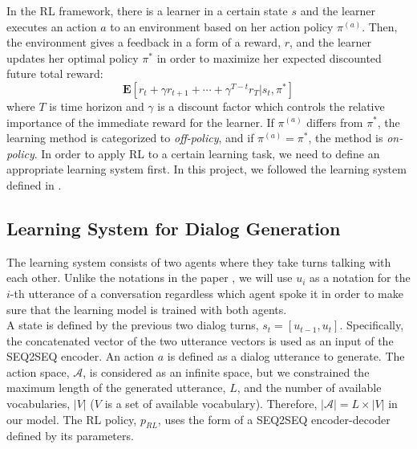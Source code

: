 In the RL framework, there is a learner in a certain state $s$ and the learner executes an action $a$ to an environment based on her action policy $\pi^{(a)}$. Then, the environment gives a feedback in a form of a reward, $r$, and the learner updates her optimal policy $\pi^*$ in order to maximize her expected discounted future total reward: 
\[
	\mathbf{E}[r_t + \gamma r_{t+1} + \cdots + \gamma^{T-t}r_T | s_t, \pi^* ]
\]
where $T$ is time horizon and $\gamma$ is a discount factor which controls the relative importance of the immediate reward for the learner. If $\pi^{(a)}$ differs from $\pi^*$, the learning method is categorized to \textit{off-policy}, and if $\pi^{(a)} = \pi^*$, the method is \textit{on-policy}. In order to apply RL to a certain learning task, we need to define an appropriate learning system first. In this project, we followed the learning system defined in \cite{Li}. 

\subsection{Learning System for Dialog Generation}
The learning system consists of two agents where they take turns talking with each other. Unlike the notations in the paper \cite{Li}, we will use $u_i$ as a notation for the $i$-th utterance of a conversation regardless which agent spoke it in order to make sure that the learning model is trained with both agents. \\
A state is defined by the previous two dialog turns, $s_t = [u_{t-1}, u_t]$. Specifically, the concatenated vector of the two utterance vectors is used as an input of the SEQ2SEQ encoder. An action $a$ is defined as a dialog utterance to generate. The action space, $\mathcal{A}$, is considered as an infinite space, but we constrained the maximum length of the generated utterance, $L$, and the number of available vocabularies, $|V|$ ($V$ is a set of available vocabulary). Therefore, $|\mathcal{A}|=L\times |V|$ in our model. The RL policy, $p_{RL}$, uses the form of a SEQ2SEQ encoder-decoder defined by its parameters. 

